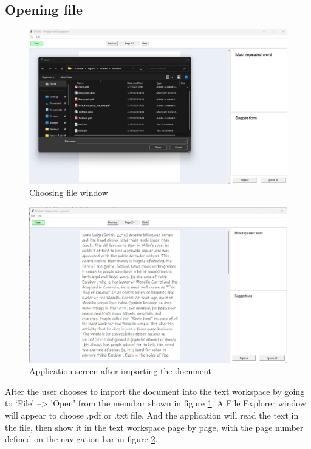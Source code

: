 \documentclass[12pt,oneside,openright,a4paper]{cpe-english-project}
\begin{document}
\subsection{Opening file}
\begin{figure}[!h]\centering
\includegraphics[width=15cm]{./img/chp4/Open.png}
\caption{Choosing file window}\label{fig:openfile}
\end{figure}
\begin{figure}[!h]\centering
\includegraphics[width=15cm]{./img/chp4/AfterImport.png}
\caption{Application screen after importing the document}\label{fig:afterimport}
\end{figure}
After the user chooses to import the document into the text workspace by going to ‘File’ –> ’Open’ from the menubar shown in figure \ref{fig:openfile}. A File Explorer window will appear to choose .pdf or .txt file. And the application will read the text in the file, then show it in the text workspace page by page, with the page number defined on the navigation bar in figure \ref{fig:afterimport}.
\end{document}
